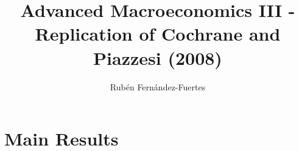 \documentclass{article}
\title{Advanced Macroeconomics III - Replication of Cochrane and Piazzesi (2008)}
\author{Rubén Fernández-Fuertes}
\date{}
\begin{document}
	\maketitle

	\section{Main Results}

	
%
\end{document}
